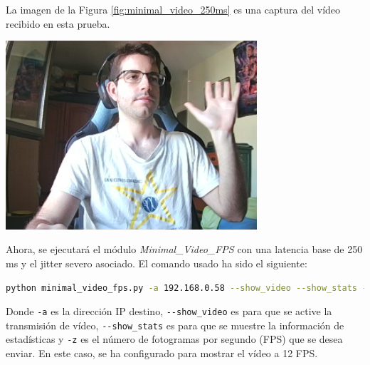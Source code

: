 \newpage
La imagen de la Figura \ref{fig:minimal_video_250ms} es una captura del vídeo recibido en esta prueba.
\begin{center}
  \includegraphics[width = 0.7\textwidth]{images/VideoRecibido6.1.png}
  \label{fig:minimal_video_250ms}
\end{center}

\newpage


Ahora, se ejecutará el módulo \textit{Minimal\_Video\_FPS} con una latencia base de 250 ms y el jitter severo asociado. El comando usado ha sido el siguiente:

\begin{lstlisting}[language=bash, basicstyle=\ttfamily\scriptsize]
    python minimal_video_fps.py -a 192.168.0.58 --show_video --show_stats -z 12
\end{lstlisting}
Donde \verb|-a| es la dirección IP destino, \verb|--show_video| es para que se active la transmisión de vídeo, \verb|--show_stats| es para que se muestre la información de estadísticas y \verb|-z| es el número de fotogramas por segundo (FPS) que se desea enviar. En este caso, se ha configurado para mostrar el vídeo a 12 FPS.
\vspace{\baselineskip}


